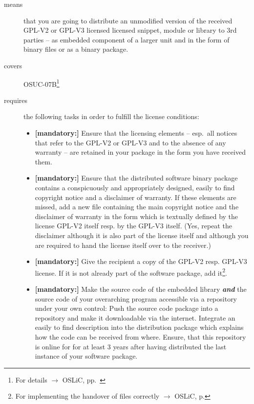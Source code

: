 \begin{description}
\item[means] that you are going to distribute an unmodified version of the
received GPL-V2 or GPL-V3 licensed licensed snippet, module or library to 3rd
parties -- as embedded component of a larger unit and in the form of binary
files or as a bi\-na\-ry package.


\item[covers] OSUC-07B\footnote{For details $\rightarrow$ OSLiC, pp.\
\pageref{OSUC-07B-DEF}}

\item[requires] the following tasks in order to fulfill the license conditions:
\begin{itemize}
  
  \item \textbf{[mandatory:]} Ensure that the licensing elements -- esp.\ all
  notices that refer to the GPL-V2 or GPL-V3 and to the absence of any
  warranty -- are retained in your package in the form you have received them.

  \item \textbf{[mandatory:]} Ensure that the distributed software binary
  package contains a conspicuously and appropriately designed, easily to find
  copyright notice and a disclaimer of warranty. If these elements are missed,
  add a new file containing the main copyright notice and the disclaimer of
  warranty in the form which is textually defined by the license GPL-V2 itself
  resp. by the GPL-V3 itself. (Yes, repeat the disclaimer although it is also
  part of the license itself and although you are required to hand the license
  itself over to the receiver.)
  
  \item \textbf{[mandatory:]} Give the recipient a copy of the GPL-V2 resp.
  GPL-V3 license. If it is not already part of the software package, add
  it\footnote{For implementing the handover of files correctly $\rightarrow$
  OSLiC, p. \pageref{DistributingFilesHint}}.
  
  \item \textbf{[mandatory:]} Make the source code of the embedded library
  \textbf{\emph{and}} the source code of your overarching program accessible via
  a repository under your own control: Push the source code package into a
  repository and make it downloadable via the internet. Integrate an easily to
  find description into the distribution package which explains how the code can
  be received from where. Ensure, that this repository is online for for at
  least 3 years after having distributed the last instance of your software
  package.
  

\end{itemize}
\end{description}
